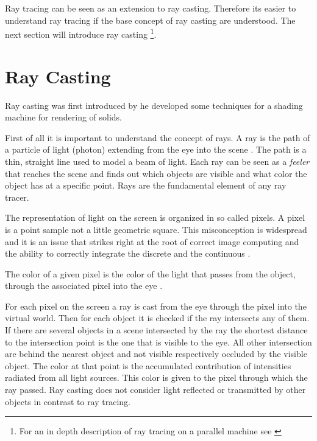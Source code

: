 Ray tracing can be seen as an extension to ray casting. Therefore its easier to
understand ray tracing if the base concept of ray casting are understood. The
next section will introduce ray casting \footnote{For an in depth description of
ray tracing on a parallel machine see 
\citep{citeulike:80546}}.

\section{Ray Casting}
Ray casting was first introduced by  \citep{Appel68} he
developed some techniques for a shading machine for rendering of solids.

First of all it is important to understand the concept of rays. A ray is the
path of a particle of light (photon) extending from the eye into the
scene \cite{Glassner289}. The path is a thin, straight line used to model a beam
of light. Each ray can be seen as a \textit{feeler} that reaches the 
scene and finds out which objects are visible and what color the object has at a 
specific point. Rays are the fundamental element of any ray tracer.

The representation of light on the screen is organized in so called pixels.
A pixel is a point sample not a little geometric square. This misconception
is widespread and it is an issue that strikes right at the root of correct
image computing and the ability to correctly integrate the discrete and the
continuous \cite{AlvyRaySmith95}.

The color of a given pixel is the color of the light that passes from the
object, through the associated pixel into the eye \cite{Hearn94}.

For each pixel on the screen a ray is cast from the eye through the pixel into
the virtual world. Then for each object it is checked if the ray intersects any
of them. If there are several objects in a scene intersected by the ray the
shortest distance to the intersection point is the one that is visible to the
eye. All other intersection are behind the nearest object and not visible
respectively occluded by the visible object. The color at that point is the
accumulated contribution of intensities radiated from all light sources. This
color is given to the pixel through which the ray passed. Ray casting does not
consider light reflected or transmitted by other objects in contrast to ray
tracing.


